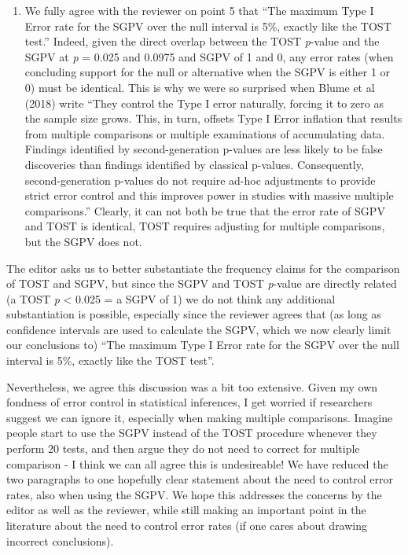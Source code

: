 \documentclass[man]{apa6}
\begin{document}
\begin{enumerate}
\item
  We fully agree with the reviewer on point 5 that \enquote{The maximum Type I Error rate for the SGPV over the null
  interval is 5\%, exactly like the TOST test.} Indeed, given the direct overlap between the TOST \emph{p}-value and the SGPV at \emph{p} = 0.025 and 0.0975 and SGPV of 1 and 0, any error rates (when concluding support for the null or alternative when the SGPV is either 1 or 0) must be identical. This is why we were so surprised when Blume et al (2018) write \enquote{They control the Type I error naturally, forcing it to zero as the sample size grows. This, in turn, offsets Type I Error inflation that results from multiple comparisons or multiple examinations of accumulating data. Findings identified by second-generation p-values are less likely to be false discoveries than findings identified by classical p-values. Consequently, second-generation p-values do not require ad-hoc adjustments to provide strict error control and this improves power in studies with massive multiple comparisons.} Clearly, it can not both be true that the error rate of SGPV and TOST is identical, TOST requires adjusting for multiple comparisons, but the SGPV does not.
\end{enumerate}

The editor asks us to better substantiate the frequency claims for the comparison of TOST and SGPV, but since the SGPV and TOST \emph{p}-value are directly related (a TOST \emph{p} \textless{} 0.025 = a SGPV of 1) we do not think any additional substantiation is possible, especially since the reviewer agrees that (as long as confidence intervals are used to calculate the SGPV, which we now clearly limit our conclusions to) \enquote{The maximum Type I Error rate for the SGPV over the null interval is 5\%, exactly like the TOST test}.

Nevertheless, we agree this discussion was a bit too extensive. Given my own fondness of error control in statistical inferences, I get worried if researchers suggest we can ignore it, especially when making multiple comparisons. Imagine people start to use the SGPV instead of the TOST procedure whenever they perform 20 tests, and then argue they do not need to correct for multiple comparison - I think we can all agree this is undesireable! We have reduced the two paragraphs to one hopefully clear statement about the need to control error rates, also when using the SGPV. We hope this addresses the concerns by the editor as well as the reviewer, while still making an important point in the literature about the need to control error rates (if one cares about drawing incorrect conclusions).
\end{document}
